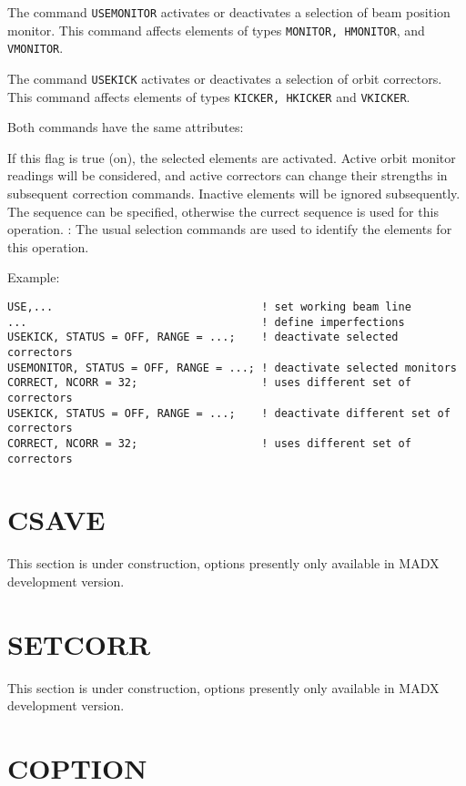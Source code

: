 The command \texttt{USEMONITOR} activates or deactivates a
selection of beam position monitor. 
This command affects elements of types \texttt{MONITOR, HMONITOR},
and \texttt{VMONITOR}.    

The command  \texttt{USEKICK} activates or deactivates a selection
of orbit correctors. This command
affects elements of types \texttt{KICKER, HKICKER} and \texttt{VKICKER}. 


Both commands have the same attributes: 
\begin{madlist}
    If this flag is true (on), the selected elements
     are activated. Active orbit monitor readings will be
     considered, and active correctors can change their strengths
     in subsequent correction commands. Inactive elements will be
     ignored subsequently.  
    The sequence can be specified, otherwise the
     currect sequence is used for this operation.  
   : The usual selection commands are
     used to identify the elements for this operation.  
\end{madlist} 

Example:
{\small
\begin{verbatim}
USE,...                                ! set working beam line 
...                                    ! define imperfections 
USEKICK, STATUS = OFF, RANGE = ...;    ! deactivate selected correctors 
USEMONITOR, STATUS = OFF, RANGE = ...; ! deactivate selected monitors   
CORRECT, NCORR = 32;                   ! uses different set of correctors
USEKICK, STATUS = OFF, RANGE = ...;    ! deactivate different set of correctors 
CORRECT, NCORR = 32;                   ! uses different set of correctors
\end{verbatim}
}

%
\section{CSAVE}
\label{sec:csave}
 This section is under construction, options presently only available in
 MADX development version.  

\section{SETCORR}
\label{sec:setcorr}
 This section is under construction, options presently only available in
 MADX development version.  


% 
\section{COPTION}
\label{sec:coption}

